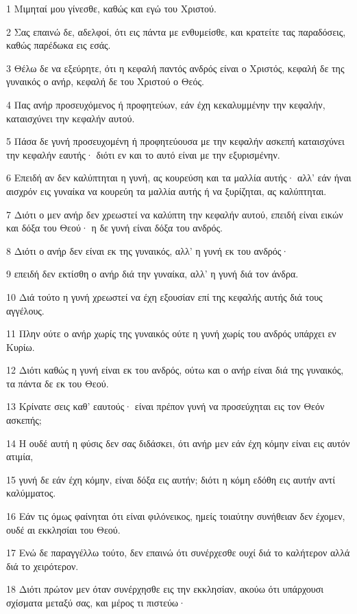 \par 1 Μιμηταί μου γίνεσθε, καθώς και εγώ του Χριστού.
\par 2 Σας επαινώ δε, αδελφοί, ότι εις πάντα με ενθυμείσθε, και κρατείτε τας παραδόσεις, καθώς παρέδωκα εις εσάς.
\par 3 Θέλω δε να εξεύρητε, ότι η κεφαλή παντός ανδρός είναι ο Χριστός, κεφαλή δε της γυναικός ο ανήρ, κεφαλή δε του Χριστού ο Θεός.
\par 4 Πας ανήρ προσευχόμενος ή προφητεύων, εάν έχη κεκαλυμμένην την κεφαλήν, καταισχύνει την κεφαλήν αυτού.
\par 5 Πάσα δε γυνή προσευχομένη ή προφητεύουσα με την κεφαλήν ασκεπή καταισχύνει την κεφαλήν εαυτής· διότι εν και το αυτό είναι με την εξυρισμένην.
\par 6 Επειδή αν δεν καλύπτηται η γυνή, ας κουρεύση και τα μαλλία αυτής· αλλ' εάν ήναι αισχρόν εις γυναίκα να κουρεύη τα μαλλία αυτής ή να ξυρίζηται, ας καλύπτηται.
\par 7 Διότι ο μεν ανήρ δεν χρεωστεί να καλύπτη την κεφαλήν αυτού, επειδή είναι εικών και δόξα του Θεού· η δε γυνή είναι δόξα του ανδρός.
\par 8 Διότι ο ανήρ δεν είναι εκ της γυναικός, αλλ' η γυνή εκ του ανδρός·
\par 9 επειδή δεν εκτίσθη ο ανήρ διά την γυναίκα, αλλ' η γυνή διά τον άνδρα.
\par 10 Διά τούτο η γυνή χρεωστεί να έχη εξουσίαν επί της κεφαλής αυτής διά τους αγγέλους.
\par 11 Πλην ούτε ο ανήρ χωρίς της γυναικός ούτε η γυνή χωρίς του ανδρός υπάρχει εν Κυρίω.
\par 12 Διότι καθώς η γυνή είναι εκ του ανδρός, ούτω και ο ανήρ είναι διά της γυναικός, τα πάντα δε εκ του Θεού.
\par 13 Κρίνατε σεις καθ' εαυτούς· είναι πρέπον γυνή να προσεύχηται εις τον Θεόν ασκεπής;
\par 14 Η ουδέ αυτή η φύσις δεν σας διδάσκει, ότι ανήρ μεν εάν έχη κόμην είναι εις αυτόν ατιμία,
\par 15 γυνή δε εάν έχη κόμην, είναι δόξα εις αυτήν; διότι η κόμη εδόθη εις αυτήν αντί καλύμματος.
\par 16 Εάν τις όμως φαίνηται ότι είναι φιλόνεικος, ημείς τοιαύτην συνήθειαν δεν έχομεν, ουδέ αι εκκλησίαι του Θεού.
\par 17 Ενώ δε παραγγέλλω τούτο, δεν επαινώ ότι συνέρχεσθε ουχί διά το καλήτερον αλλά διά το χειρότερον.
\par 18 Διότι πρώτον μεν όταν συνέρχησθε εις την εκκλησίαν, ακούω ότι υπάρχουσι σχίσματα μεταξύ σας, και μέρος τι πιστεύω·
